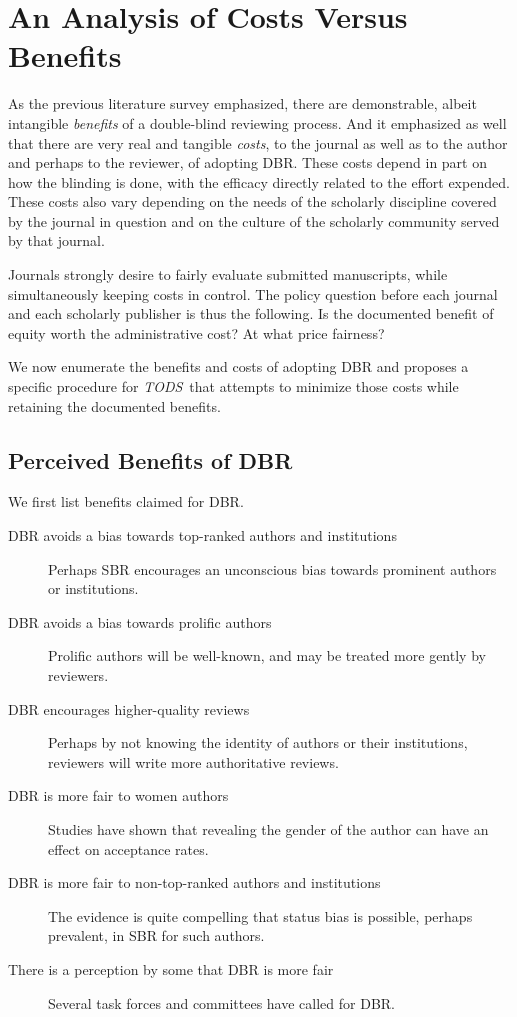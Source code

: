 \documentclass[acmtods,acmnow]{acmtrans2m}
\newcommand{\tods}{{\em TODS\/}}
\begin{document}
\section{An Analysis of Costs Versus Benefits}

As the previous literature survey emphasized, there are demonstrable, albeit
intangible {\em benefits} of a double-blind reviewing process. And it
emphasized as well that there are very real and tangible {\em costs}, to the
journal as well as to the author and perhaps to the reviewer, of adopting
DBR. These costs depend in part on how the blinding is done, with the
efficacy directly related to the effort expended. These costs also vary
depending on the needs of the scholarly discipline covered by the journal in
question and on the culture of the scholarly community served by that
journal.

Journals strongly desire to
fairly evaluate submitted manuscripts, while simultaneously keeping costs in
control. The policy question before each journal and each scholarly
publisher is thus the following. Is the documented benefit of equity worth
the administrative cost? At what price fairness?

We now enumerate the benefits and costs of adopting DBR and
proposes a specific procedure for \tods\ that attempts to
minimize those costs while retaining the documented benefits.

\subsection{Perceived Benefits of DBR}\label{sec:benefits}

We first list benefits claimed for DBR.

\begin{description}
\item [DBR avoids a bias towards top-ranked authors and institutions]
Perhaps SBR encourages an unconscious bias towards prominent authors or institutions.

\item[DBR avoids a bias towards prolific authors] Prolific authors will be
well-known, and may be treated more gently by reviewers.

\item[DBR encourages higher-quality reviews] Perhaps by not knowing the
identity of authors or their institutions, reviewers will write more
authoritative reviews.

\item[DBR is more fair to women authors] Studies have shown that revealing the
gender of the author can have an effect on acceptance rates.

\item[DBR is more fair to non-top-ranked authors and institutions] The
evidence is quite compelling that status bias is possible, perhaps
prevalent, in SBR for such authors.

\item[There is a perception by some that DBR is more fair] 
Several task forces and committees have called for DBR.
\end{description}
\end{document}
